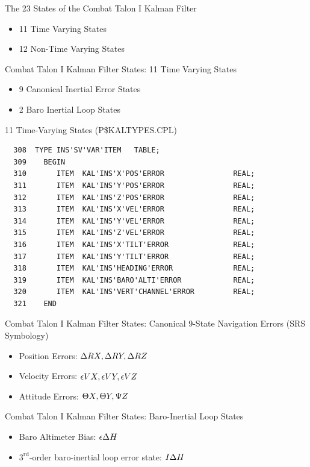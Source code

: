 \begin{frame}
The 23 States of the Combat Talon I Kalman Filter
 \begin{itemize}
 \item 11 Time Varying States
 \item 12 Non-Time Varying States
\end{itemize}
\end{frame}

\begin{frame}
Combat Talon I Kalman Filter States: 11 Time Varying States
\begin{itemize}
  \item 9 Canonical Inertial Error States
  \item 2 Baro Inertial Loop States
\end{itemize} 
\end{frame}
\begin{frame}
11 Time-Varying States (P\$KALTYPES.CPL)
\begin{verbatim}
  308  TYPE INS'SV'VAR'ITEM   TABLE;
  309    BEGIN
  310       ITEM  KAL'INS'X'POS'ERROR                REAL;
  311       ITEM  KAL'INS'Y'POS'ERROR                REAL;
  312       ITEM  KAL'INS'Z'POS'ERROR                REAL;
  313       ITEM  KAL'INS'X'VEL'ERROR                REAL;
  314       ITEM  KAL'INS'Y'VEL'ERROR                REAL;
  315       ITEM  KAL'INS'Z'VEL'ERROR                REAL;
  316       ITEM  KAL'INS'X'TILT'ERROR               REAL;
  317       ITEM  KAL'INS'Y'TILT'ERROR               REAL;
  318       ITEM  KAL'INS'HEADING'ERROR              REAL;
  319       ITEM  KAL'INS'BARO'ALTI'ERROR            REAL;
  320       ITEM  KAL'INS'VERT'CHANNEL'ERROR         REAL;
  321    END
 \end{verbatim}
\end{frame}

\begin{frame}
Combat Talon I Kalman Filter States: Canonical 9-State Navigation Errors (SRS Symbology)
\begin{itemize}
\item Position Errors: $\Delta RX,\Delta RY,\Delta RZ$
\item Velocity Errors: $\epsilon VX,\epsilon VY,\epsilon VZ$
\item Attitude Errors: $\Theta X,
\Theta Y,\Psi Z$
\end{itemize}
\end{frame}
\begin{frame}
Combat Talon I Kalman Filter States: Baro-Inertial Loop States
\begin{itemize}
\item Baro Altimeter Bias: $\epsilon\Delta H$
\item $3^{\text{rd}}$-order baro-inertial loop error state: $I\Delta H$
\end{itemize}
\end{frame}


